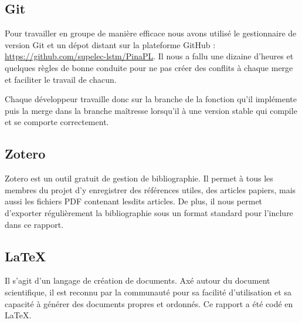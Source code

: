 \subsection{Git}
Pour travailler en groupe de manière efficace nous avons utilisé le gestionnaire de version Git et un dépot distant sur la plateforme GitHub :
\url{https://github.com/supelec-lstm/PinaPL}. Il nous a fallu une dizaine d'heures et quelques règles de bonne conduite pour ne pas créer des conflits à chaque merge et faciliter le travail de chacun.

\smallskip

Chaque développeur travaille donc sur la branche de la fonction qu'il implémente puis la merge dans la branche maîtresse lorsqu'il à une version stable qui compile et se comporte correctement.

\subsection{Zotero}

Zotero est un outil gratuit de gestion de bibliographie. Il permet à tous les membres du projet d'y enregistrer des références utiles, des articles papiers, mais aussi les fichiers PDF contenant lesdits articles.
De plus, il nous permet d'exporter régulièrement la bibliographie sous un format standard pour l'inclure dans ce rapport.

\subsection{LaTeX}

Il s'agit d'un langage de création de documents. Axé autour du document scientifique, il est reconnu par la communauté pour sa facilité d'utilisation et sa capacité à générer des documents propres et ordonnés. Ce rapport a été codé en LaTeX.